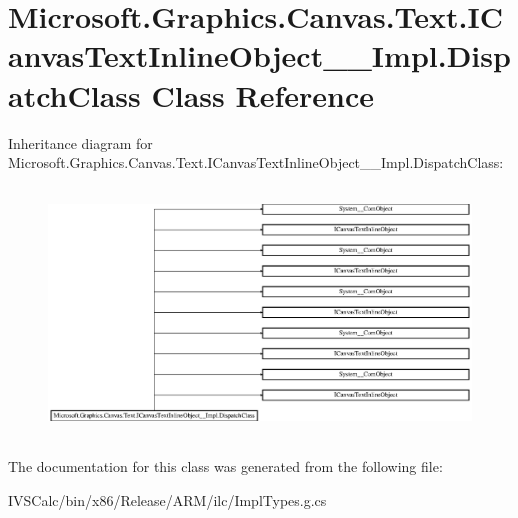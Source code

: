 \hypertarget{class_microsoft_1_1_graphics_1_1_canvas_1_1_text_1_1_i_canvas_text_inline_object_____impl_1_1_dispatch_class}{}\section{Microsoft.\+Graphics.\+Canvas.\+Text.\+I\+Canvas\+Text\+Inline\+Object\+\_\+\+\_\+\+Impl.\+Dispatch\+Class Class Reference}
\label{class_microsoft_1_1_graphics_1_1_canvas_1_1_text_1_1_i_canvas_text_inline_object_____impl_1_1_dispatch_class}
Inheritance diagram for Microsoft.\+Graphics.\+Canvas.\+Text.\+I\+Canvas\+Text\+Inline\+Object\+\_\+\+\_\+\+Impl.\+Dispatch\+Class\+:\begin{figure}[H]
\begin{center}
\leavevmode
\includegraphics[height=6.666667cm]{class_microsoft_1_1_graphics_1_1_canvas_1_1_text_1_1_i_canvas_text_inline_object_____impl_1_1_dispatch_class}
\end{center}
\end{figure}


The documentation for this class was generated from the following file\+:\begin{DoxyCompactItemize}
\item 
I\+V\+S\+Calc/bin/x86/\+Release/\+A\+R\+M/ilc/Impl\+Types.\+g.\+cs\end{DoxyCompactItemize}
